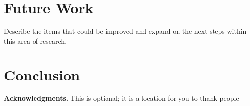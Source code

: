 \documentclass{article}
\begin{document}
\section{Future Work}
\label{future-work}

Describe the items that could be improved and expand on the next steps within
this area of research.

\section{Conclusion}
\label{conclusion}

{\bf Acknowledgments.} This is optional; it is a location for you to thank
people



\end{document}
